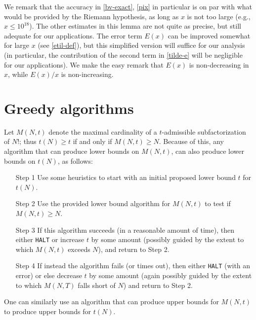 \documentclass[12pt,a4paper,reqno]{amsart}
\numberwithin{equation}{section}
\theoremstyle{plain}
\theoremstyle{definition}
\begin{document}
We remark that the accuracy in \eqref{bv-exact}, \eqref{pix} in particular is on par with what would be provided by the Riemann hypothesis, as long as $x$ is not too large (e.g., $x \leq 10^{18}$).  The other estimates in this lemma are not quite as precise, but still adequate for our applications.  The error term $E(x)$ can be improved somewhat for large $x$ (see \eqref{etil-def}), but this simplified version will suffice for our analysis (in particular, the contribution of the second term in \eqref{tilde-e} will be negligible for our applications).  We make the easy remark that $E(x)$ is non-decreasing in $x$, while $E(x)/x$ is non-increasing.

\section{Greedy algorithms}\label{greedy-sec}

Let $M(N,t)$ denote the maximal cardinality of a $t$-admissible subfactorization of $N!$; thus $t(N) \geq t$ if and only if $M(N,t) \geq N$.  Because of this, any algorithm that can produce lower bounds on $M(N,t)$, can also produce lower bounds on $t(N)$, as follows:

\begin{itemize}
  \item[Step 1] Use some heuristics to start with an initial proposed lower bound $t$ for $t(N)$.
  \item[Step 2] Use the provided lower bound algorithm for $M(N,t)$ to test if $M(N,t) \geq N$.
  \item[Step 3] If this algorithm succeeds (in a reasonable amount of time), then either \texttt{HALT} or increase $t$ by some amount (possibly guided by the extent to which $M(N,t)$ exceeds $N$), and return to Step 2.
  \item[Step 4] If instead the algorithm fails (or times out), then either \texttt{HALT} (with an error) or else decrease $t$ by some amount (again possibly guided by the extent to which $M(N,T)$ falls short of $N$) and return to Step 2.
\end{itemize}

One can similarly use an algorithm that can produce upper bounds for $M(N,t)$ to produce upper bounds for $t(N)$.
\end{document}
